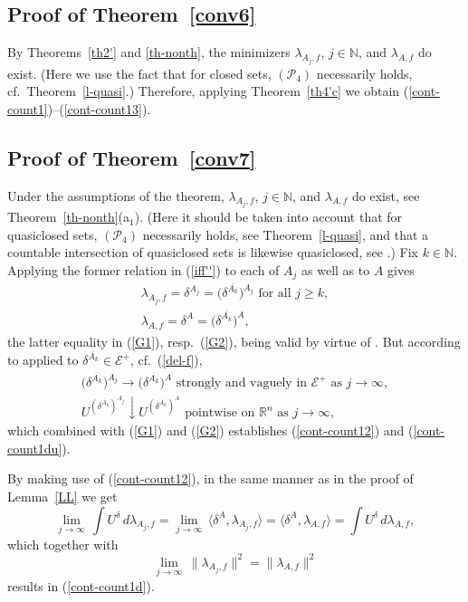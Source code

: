 \documentclass[12pt,a4paper,reqno]{amsart} %
\theoremstyle{lause}
\theoremstyle{maaritelma}
\theoremstyle{lause}
\theoremstyle{maaritelma}
\numberwithin{equation}{section}
\begin{document}
\subsection{Proof of Theorem~\ref{conv6}}\label{sec-pr8'} By Theorems~\ref{th2'} and \ref{th-nonth}, the minimizers $\lambda_{A_j,f}$, $j\in\mathbb N$, and $\lambda_{A,f}$ do exist. (Here we use the fact that for closed sets, $(\mathcal P_4)$ necessarily holds, cf.\ Theorem~\ref{l-quasi}.) Therefore, applying Theorem~\ref{th4'c} we obtain (\ref{cont-count1})--(\ref{cont-count13}).

\subsection{Proof of Theorem~\ref{conv7}}\label{sec-pr8} Under the assumptions of the theorem, $\lambda_{A_j,f}$, $j\in\mathbb N$, and $\lambda_{A,f}$ do exist, see Theorem~\ref{th-nonth}(a$_1$). (Here it should be taken into account that for quasiclosed sets, $(\mathcal P_4)$ necessarily holds, see Theorem~\ref{l-quasi}, and that a countable intersection of quasiclosed sets is likewise quasiclosed, see \cite[Lemma~2.3]{F71}.)
Fix $k\in\mathbb N$. Applying the former relation in (\ref{iff''}) to each of $A_j$ as well as to $A$ gives
\begin{gather}
 \lambda_{A_j,f}=\delta^{A_j}=\bigl(\delta^{\overline{A_k}}\bigr)^{A_j}\text{ \ for all $j\geqslant k$},\label{G1}\\
 \lambda_{A,f}=\delta^A=\bigl(\delta^{\overline{A_k}}\bigr)^{A},\label{G2}
\end{gather}
the latter equality in (\ref{G1}), resp.\ (\ref{G2}), being valid by virtue of \cite[Corollary~4.2]{Z-bal}.
But according to \cite[Theorem~4.10]{Z-arx1} applied to $\delta^{\overline{A_k}}\in\mathcal E^+$, cf.\ (\ref{del-f}),
\begin{gather*}
 \bigl(\delta^{\overline{A_k}}\bigr)^{A_j}\to\bigl(\delta^{\overline{A_k}}\bigr)^{A}\text{ \ strongly and vaguely in $\mathcal E^+$ as $j\to\infty$},\\
 U^{(\delta^{\overline{A_k}})^{A_j}}\downarrow U^{(\delta^{\overline{A_k}})^{A}}\text{ \ pointwise on $\mathbb R^n$ as $j\to\infty$},
\end{gather*}
which combined with (\ref{G1}) and (\ref{G2}) establishes (\ref{cont-count12}) and (\ref{cont-count1du}).

By making use of (\ref{cont-count12}), in the same manner as in the proof of Lemma~\ref{LL} we get
\[\lim_{j\to\infty}\,\int U^\delta\,d\lambda_{A_j,f}=\lim_{j\to\infty}\,\langle\delta^A,\lambda_{A_j,f}\rangle=\langle\delta^A,\lambda_{A,f}\rangle=\int U^\delta\,d\lambda_{A,f},\]
which together with
\[\lim_{j\to\infty}\,\|\lambda_{A_j,f}\|^2=\|\lambda_{A,f}\|^2\]
results in (\ref{cont-count1d}).
\end{document}
